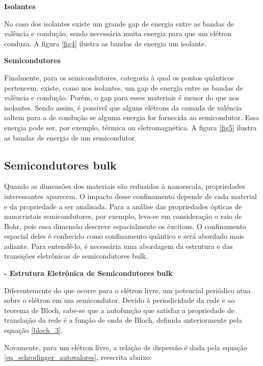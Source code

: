 	\par \textbf{Isolantes}

		\par No caso dos isolantes existe um grande gap de energia entre as bandas de valência e condução, sendo necessária muita energia para que um elétron conduza. A figura \ref{fig4} ilustra as bandas de energia um isolante.

	\par \textbf{Semicondutores}
	
		\par Finalmente, para os semicondutores, categoria à qual os pontos quânticos pertencem, existe, como nos isolantes, um gap de energia entre as bandas de valência e condução. Porém, o gap para esses materiais é menor do que nos isolantes. Sendo assim, é possível que alguns elétrons da camada de valência saltem para a de condução se alguma energia for fornecida ao semicondutor. Essa energia pode ser, por exemplo, térmica ou eletromagnética. A figura \ref{fig5} ilustra as bandas de energia de um semicondutor.

\subsection{Semicondutores bulk}

	\par Quando as dimensões dos materiais são reduzidas à nanoescala, propriedades interessantes aparecem. O impacto desse confinamento depende de cada material e da propriedade a ser analisada. Para a análise das propriedades ópticas de nanocristais semicondutores, por exemplo, leva-se em consideração o raio de Bohr, pois essa dimensão descreve espacialmente os éxcitons. O confinamento espacial deles é conhecido como confinamento quântico e será abordado mais adiante. Para entendê-lo, é necessária uma abordagem da estrutura e das transições eletrônicas de semicondutores bulk. 

	\par \textbf{- Estrutura Eletrônica de Semicondutores bulk}

		\par Diferentemente do que ocorre para o elétron livre, um potencial periódico atua sobre o elétron em um semicondutor. Devido à periodicidade da rede e ao teorema de Bloch, sabe-se que a autofunção que satisfaz a propriedade de translação da rede é a função de onda de Bloch, definida anteriormente pela equação \eqref{bloch_3}.

		\par Novamente, para um elétron livre, a relação de dispersão é dada pela equação \eqref{eq_schrodinger_autovalores}, reescrita abaixo:

